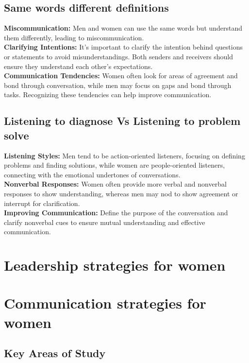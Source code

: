 \documentclass[12pt]{article}
\begin{document}
\subsection{Same words different definitions}

\textbf{Miscommunication:}  Men and women can use the same words but understand them differently, leading to miscommunication.\\
\textbf{Clarifying Intentions:}  It's important to clarify the intention behind questions or statements to avoid misunderstandings. Both senders and receivers should ensure they understand each other's expectations.\\
\textbf{Communication Tendencies:}  Women often look for areas of agreement and bond through conversation, while men may focus on gaps and bond through tasks. Recognizing these tendencies can help improve communication.

\subsection{Listening to diagnose Vs Listening to problem solve}
\textbf{Listening Styles:}  Men tend to be action-oriented listeners, focusing on defining problems and finding solutions, while women are people-oriented listeners, connecting with the emotional undertones of conversations.\\
\textbf{Nonverbal Responses:}  Women often provide more verbal and nonverbal responses to show understanding, whereas men may nod to show agreement or interrupt for clarification.\\
\textbf{Improving Communication:}  Define the purpose of the conversation and clarify nonverbal cues to ensure mutual understanding and effective communication.
\section{  Leadership strategies for women}

\section{ Communication strategies for women}


\subsection{Key Areas of Study}
\end{document}
